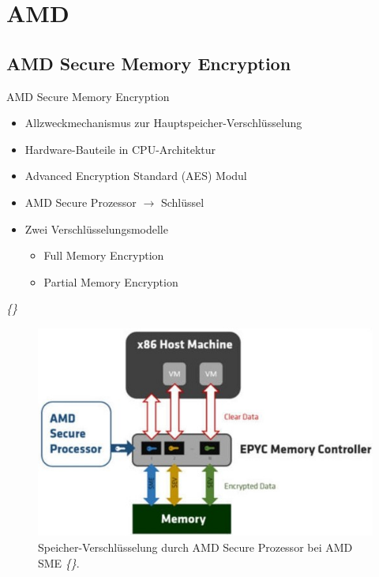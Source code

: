 \documentclass{sdqbeamer}
\begin{document}
\section{AMD}

\subsection{AMD Secure Memory Encryption}
\begin{frame}{AMD Secure Memory Encryption}
	\begin{minipage}{0.49\linewidth}
		\begin{itemize}
			\item Allzweckmechanismus zur Hauptspeicher-Verschlüsselung
			\item Hardware-Bauteile in CPU-Architektur
			\item Advanced Encryption Standard (AES) Modul
			\item AMD Secure Prozessor \(\rightarrow\) Schlüssel
			\item Zwei Verschlüsselungsmodelle
			\begin{itemize}
				\item Full Memory Encryption
				\item Partial Memory Encryption
			\end{itemize}
		\end{itemize}
		\vspace{3ex}
		\vfill
		\small\textit{\{\cite{kaplan}\}}
	\end{minipage}
	\begin{minipage}{0.5\linewidth}
		\begin{figure}[!h]
			\centering
			\includegraphics[width=\linewidth]{Bilder/AMD_SMESEV.jpg}
			\caption{Speicher-Verschlüsselung durch AMD Secure Prozessor bei AMD SME \textit{\{\cite{amd}\}}. }
		\end{figure}
	\end{minipage}
\end{frame}
\end{document}
